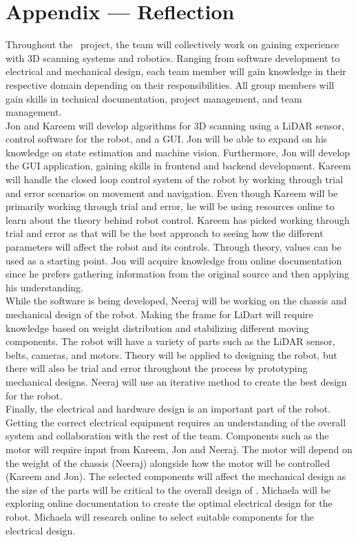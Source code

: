 \documentclass[12pt]{article}
\begin{document}
\newpage{}
\section*{Appendix --- Reflection}

	Throughout the \progname\ project, the team will collectively work on gaining experience with 3D scanning systems and robotics.  Ranging from software development to electrical and mechanical design, each team member will gain knowledge in their respective domain depending on their responsibilities. All group members will gain skills in technical documentation, project management, and team management.
\newline
\\
Jon and Kareem will develop algorithms for 3D scanning using a LiDAR sensor, control software for the robot, and a GUI. Jon will be able to expand on his knowledge on state estimation and machine vision. Furthermore, Jon will develop the GUI application, gaining skills in frontend and backend development. Kareem will handle the closed loop control system of the robot by working through trial and error scenarios on movement and navigation. Even though Kareem will be primarily working through trial and error, he will be using resources online to learn about the theory behind robot control. Kareem has picked working through trial and error as that will be the best approach to seeing how the different parameters will affect the robot and its controls. Through theory, values can be used as a starting point. Jon will acquire knowledge from online documentation since he prefers gathering information from the original source and then applying his understanding. 
\newline
\\
While the software is being developed, Neeraj will be working on the chassis and mechanical design of the robot. Making the frame for LiDart will require knowledge based on weight distribution and stabilizing different moving components. The robot will have a variety of parts such as the LiDAR sensor, belts, cameras, and motors. Theory will be applied to designing the robot, but there will also be trial and error throughout the process by prototyping mechanical designs. Neeraj will use an iterative method to create the best design for the robot. 
\newline
\\
Finally, the electrical and hardware design is an  important part of the robot. Getting the correct electrical equipment requires an understanding of the overall system and collaboration with the rest of the team. Components such as the motor will require input from Kareem, Jon and Neeraj. The motor will depend on the weight of the chassis (Neeraj) alongside how the motor will be controlled (Kareem and Jon). The selected components will affect the mechanical design as the size of the parts will be critical to the overall design of \progname. Michaela will be exploring online documentation to create the optimal electrical design for the robot. Michaela will research online to select suitable components for the electrical design. 
\end{document}

